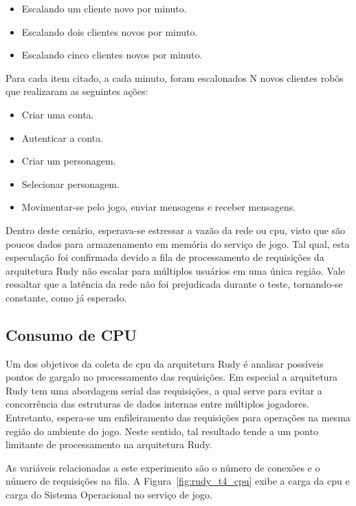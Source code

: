\begin{itemize}
 \item Escalando um cliente novo por minuto.
 \item Escalando dois clientes novos por minuto.
 \item Escalando cinco clientes novos por minuto.
\end{itemize}

Para cada item citado, a cada minuto, foram escalonados N novos clientes robôs que realizaram as seguintes ações:

\begin{itemize}
 \item Criar uma conta.
 \item Autenticar a conta.
 \item Criar um personagem.
 \item Selecionar personagem.
 \item Movimentar-se pelo jogo, enviar mensagens e receber mensagens. %
\end{itemize}

Dentro deste cenário, esperava-se estressar a vazão da rede ou \ac{cpu}, visto que são poucos dados para armazenamento em memória do serviço de jogo.
%
Tal qual, esta especulação foi confirmada devido a fila de processamento de requisições da arquitetura Rudy não escalar para múltiplos usuários em uma única região.
%
Vale ressaltar que a latência da rede não foi prejudicada durante o teste, tornando-se constante, como já esperado.


\subsection{Consumo de CPU}

Um dos objetivos da coleta de \ac{cpu} da arquitetura Rudy é analisar possíveis pontos de gargalo no processamento das requisições.
%
Em especial a arquitetura Rudy tem uma abordagem serial das requisições, a qual serve para evitar a concorrência das estruturas de dados internas entre múltiplos jogadores.
%
Entretanto, espera-se um enfileiramento das requisições para operações na mesma região do ambiente do jogo.
%
Neste sentido, tal resultado tende a um ponto limitante de processamento na arquitetura Rudy.

As variáveis relacionadas a este experimento são o número de conexões e o número de requisições na fila.
%
A Figura~\ref{fig:rudy_t4_cpu} exibe a carga da \ac{cpu} e carga do Sistema Operacional no serviço de jogo.


